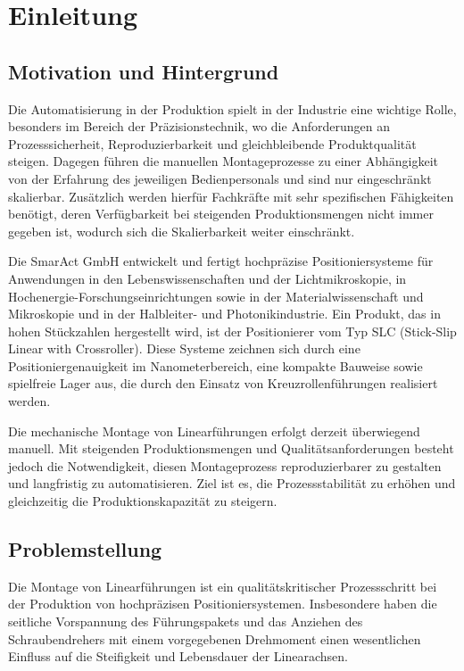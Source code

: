 \section{Einleitung}
\subsection{Motivation und Hintergrund}
Die Automatisierung in der Produktion spielt in der Industrie eine wichtige Rolle, besonders im Bereich der Präzisionstechnik, wo die Anforderungen an Prozesssicherheit, Reproduzierbarkeit und gleichbleibende Produktqualität steigen. Dagegen führen die manuellen Montageprozesse zu einer Abhängigkeit von der Erfahrung des jeweiligen Bedienpersonals und sind nur eingeschränkt skalierbar. Zusätzlich werden hierfür Fachkräfte mit sehr spezifischen Fähigkeiten benötigt, deren Verfügbarkeit bei steigenden Produktionsmengen nicht immer gegeben ist, wodurch sich die Skalierbarkeit weiter einschränkt.\cite{Groover_Automation, Lotter_Montage}

Die SmarAct GmbH entwickelt und fertigt hochpräzise Positioniersysteme für Anwendungen in den Lebenswissenschaften und der Lichtmikroskopie, in Hochenergie-Forschungs\-einrichtungen sowie in der Materialwissenschaft und Mikroskopie und in der Halbleiter- und Photonikindustrie.\cite{SmarAct_Company} Ein Produkt, das in hohen Stückzahlen hergestellt wird, ist der Positionierer vom Typ SLC (Stick-Slip Linear with Crossroller). Diese Systeme zeichnen sich durch eine Positioniergenauigkeit im Nanometerbereich, eine kompakte Bauweise sowie spielfreie Lager aus, die durch den Einsatz von Kreuzrollenführungen realisiert werden.\cite{SmarAct_SLC}

Die mechanische Montage von Linearführungen erfolgt derzeit überwiegend manuell. Mit steigenden Produktionsmengen und Qualitätsanforderungen besteht jedoch die Notwendigkeit, diesen Montageprozess reproduzierbarer zu gestalten und langfristig zu automatisieren. Ziel ist es, die Prozessstabilität zu erhöhen und gleichzeitig die Produktionskapazität zu steigern.

\subsection{Problemstellung}
Die Montage von Linearführungen ist ein qualitätskritischer Prozessschritt bei der Produktion von hochpräzisen Positioniersystemen.\cite{Lotter_Montage} Insbesondere haben die seitliche Vorspannung des Führungspakets und das Anziehen des Schraubendrehers mit einem vorgegebenen Drehmoment einen wesentlichen Einfluss auf die Steifigkeit und Lebensdauer der Linearachsen.\cite{VDI2230, Roloff_Matek}

